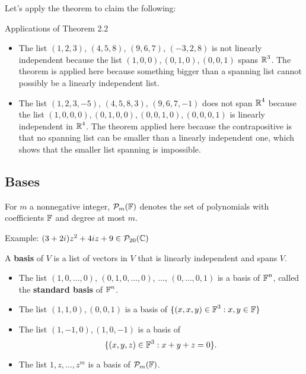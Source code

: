 Let's apply the theorem to claim the following:

\begin{example} Applications of Theorem 2.2
    \begin{itemize}
        \item The list $(1, 2, 3)$, $(4, 5, 8)$, $(9, 6, 7)$, $(-3, 2, 8)$ is not linearly 
        independent because the list 
        $(1, 0, 0), (0, 1, 0), (0, 0, 1)$ spans $\operatorname{\mathbb{R}}^3$. 
        The theorem is applied here because something bigger
        than a spanning list cannot possibly be a linearly independent list.
        \item The list
        $(1, 2, 3, -5)$, $(4, 5, 8, 3)$, $(9, 6, 7, -1)$ 
        does not span $\operatorname{\mathbb{R}}^4$ because
        the list $(1, 0, 0, 0), (0, 1, 0, 0), (0, 0, 1, 0), (0, 0, 0, 1)$ is linearly independent
        in $\operatorname{\mathbb{R}}^4$. The theorem applied here because the contrapositive is that no spanning list 
        can be smaller than a linearly independent one, which shows that the smaller list spanning
        is impossible.
    \end{itemize}
\end{example}

\subsection{Bases}

\begin{definition} [$\Polys{\F}{m}$]
    For $m$ a nonnegative integer, $\Polys{\F}{m}$ denotes
    the set of polynomials with coefficients $\operatorname{\mathbb{F}}$ and degree
    at most $m$.
\end{definition}

Example:
$(3 + 2i)z^2 + 4iz + 9 \in \mathcal{P}_{20}(\operatorname{\mathbb{C}})$

\begin{definition} [basis]
    A \textbf{basis} of $V$ is a list of vectors in $V$
    that is linearly independent and spans $V$.
\end{definition}

\begin{example} 
   \begin{itemize}
       \item The list $(1, 0, \dots, 0)$, $(0,1,0,\dots,0)$, $\dots$,
       $(0, \dots, 0, 1)$ is a basis of $\operatorname{\mathbb{F}}^n$, called the \textbf{standard basis}
       of $\operatorname{\mathbb{F}}^n$.
       \item The list $(1,1,0),(0,0,1)$ is a basis of $\{(x,x,y) \in \operatorname{\mathbb{F}}^3 : x, y \in \operatorname{\mathbb{F}} \}$
       \item The list $(1, -1, 0), (1, 0, -1)$ is a basis of 
       \[ \{(x, y, z) \in \operatorname{\mathbb{F}}^3 : x + y + z = 0\}. \]
       \item The list $1, z, \dots, z^m$ is a basis of $\Polys{\F}{m}$.
   \end{itemize}
\end{example}

